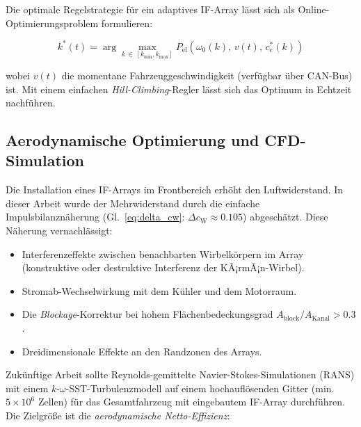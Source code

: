 ﻿\documentclass[12pt, a4paper]{report}
\theoremstyle{definition}
\theoremstyle{remark}
\newcommand{\cW}{c_{\text{W}}}
\begin{document}
Die optimale Regelstrategie für ein adaptives IF-Array lässt sich als
Online-Optimie\-rungsproblem formulieren:

\begin{equation}
  k^*(t) = \arg\max_{k\,\in\,[k_{\min},k_{\max}]}
  P_{\text{el}}\!\left(\omega_0(k),\, v(t),\, c_e^*(k)\right)
  \label{eq:k_opt_online}
\end{equation}

wobei $v(t)$ die momentane Fahrzeuggeschwindigkeit (verfügbar über CAN-Bus) ist.
Mit einem einfachen \emph{Hill-Climbing}-Regler lässt sich das Optimum
in Echtzeit nachführen.

\subsection{Aerodynamische Optimierung und CFD-Simulation}
\label{ssec:ausblick_cfd}

Die Installation eines IF-Arrays im Frontbereich erhöht den Luftwiderstand.
In dieser Arbeit wurde der Mehrwiderstand durch die einfache Impulsbilanznäherung
(Gl.~\eqref{eq:delta_cw}: $\Delta\cW \approx 0.105$) abgeschätzt. Diese
Näherung vernachlässigt:

\begin{itemize}
  \item Interferenzeffekte zwischen benachbarten Wirbelkörpern im Array
        (konstruktive oder destruktive Interferenz der KÃ¡rmÃ¡n-Wirbel).
  \item Stromab-Wechselwirkung mit dem Kühler und dem Motorraum.
  \item Die \emph{Blockage}-Korrektur bei hohem Flächenbedeckungsgrad
        $A_{\text{block}}/A_{\text{Kanal}} > 0.3$.
  \item Dreidimensionale Effekte an den Randzonen des Arrays.
\end{itemize}

Zukünftige Arbeit sollte Reynolds-gemittelte Navier-Stokes-Simulationen (RANS)
mit einem $k$-$\omega$-SST-Turbulenzmodell auf einem hochauflösenden Gitter
(min.\ $5 \times 10^6$ Zellen) für das Gesamtfahrzeug mit eingebautem IF-Array
durchführen. Die Zielgröße ist die \emph{aerodynamische Netto-Effizienz}:
\end{document}
